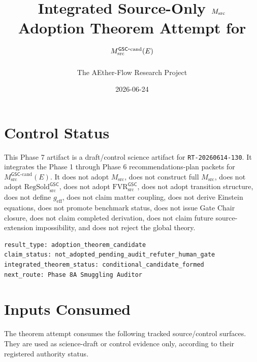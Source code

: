 \documentclass[11pt]{article}
\title{Integrated Source-Only \(\Msrc\) Adoption Theorem Attempt for \(\Mgsccand(E)\)}
\author{The AEther-Flow Research Project}
\date{2026-06-24}
\newcommand{\Msrc}{M_{\mathrm{src}}}
\newcommand{\Mgsccand}{M_{\mathrm{src}}^{\mathsf{GSC}\mbox{-}\mathrm{cand}}}
\newcommand{\RegSold}{\mathrm{RegSold}_{\mathrm{src}}^{\mathsf{GSC}}}
\newcommand{\FVR}{\mathrm{FVR}_{\mathrm{src}}^{\mathsf{GSC}}}
\begin{document}
\maketitle

\section{Control Status}

This Phase 7 artifact is a draft/control science artifact for
\texttt{RT-20260614-130}. It integrates the Phase 1 through Phase 6
recommendations-plan packets for \(\Mgsccand(E)\). It does not adopt
\(\Msrc\), does not construct full \(\Msrc\), does not adopt \(\RegSold\), does
not adopt \(\FVR\), does not adopt transition structure, does not define
\(g_{\mathrm{eff}}\), does not claim matter coupling, does not derive Einstein
equations, does not promote benchmark status, does not issue Gate Chair
closure, does not claim completed derivation, does not claim future
source-extension impossibility, and does not reject the global theory.

\begin{verbatim}
result_type: adoption_theorem_candidate
claim_status: not_adopted_pending_audit_refuter_human_gate
integrated_theorem_status: conditional_candidate_formed
next_route: Phase 8A Smuggling Auditor
\end{verbatim}

\section{Inputs Consumed}

The theorem attempt consumes the following tracked source/control surfaces.
They are used as science-draft or control evidence only, according to their
registered authority status.
\end{document}
